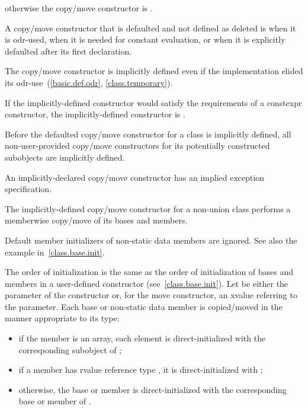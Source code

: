 %
otherwise the copy/move constructor is
.

\pnum
{}%
%
A copy/move constructor
that is defaulted and not defined as deleted
is
when it is odr-used,
when it is needed for constant evaluation, or
when it is explicitly defaulted after its first declaration.
\begin{note}
The copy/move constructor is implicitly defined even if the implementation elided
its odr-use~(\ref{basic.def.odr}, \ref{class.temporary}).
\end{note}
If the implicitly-defined constructor would satisfy the requirements of a
constexpr constructor, the implicitly-defined
constructor is .

\pnum
Before the defaulted copy/move constructor for a class is
implicitly defined,
all non-user-provided copy/move constructors for its
potentially constructed subobjects
are implicitly defined.
\begin{note}
An implicitly-declared copy/move constructor has an
implied exception specification.
\end{note}

\pnum
The implicitly-defined copy/move constructor for a non-union class
performs a memberwise copy/move of its bases and members.
\begin{note}
Default member initializers of non-static data members are ignored. See also the example in~\ref{class.base.init}.
\end{note}
The order of initialization is the same as the order of initialization of bases
and members in a user-defined constructor (see~\ref{class.base.init}).
Let  be either the parameter of the constructor or, for the move constructor, an
xvalue referring to the parameter.
Each base or non-static data member
is copied/moved in the manner appropriate to its type:
\begin{itemize}
\item
if the member is an array, each element is
direct-initialized with the corresponding subobject of ;

\item
if a member  has rvalue reference type , it is direct-initialized with
;

\item
otherwise, the base or member is direct-initialized with the corresponding base or member of .
\end{itemize}

